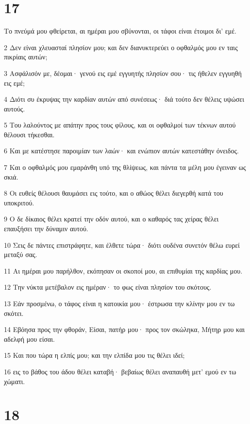 \chapter{17}

\par Το πνεύμά μου φθείρεται, αι ημέραι μου σβύνονται, οι τάφοι είναι έτοιμοι δι' εμέ.
\par 2 Δεν είναι χλευασταί πλησίον μου; και δεν διανυκτερεύει ο οφθαλμός μου εν ταις πικρίαις αυτών;
\par 3 Ασφάλισόν με, δέομαι· γενού εις εμέ εγγυητής πλησίον σου· τις ήθελεν εγγυηθή εις εμέ;
\par 4 Διότι συ έκρυψας την καρδίαν αυτών από συνέσεως· διά τούτο δεν θέλεις υψώσει αυτούς.
\par 5 Του λαλούντος με απάτην προς τους φίλους, και οι οφθαλμοί των τέκνων αυτού θέλουσι τήκεσθαι.
\par 6 Και με κατέστησε παροιμίαν των λαών· και ενώπιον αυτών κατεστάθην όνειδος.
\par 7 Και ο οφθαλμός μου εμαράνθη υπό της θλίψεως, και πάντα τα μέλη μου έγειναν ως σκιά.
\par 8 Οι ευθείς θέλουσι θαυμάσει εις τούτο, και ο αθώος θέλει διεγερθή κατά του υποκριτού.
\par 9 Ο δε δίκαιος θέλει κρατεί την οδόν αυτού, και ο καθαρός τας χείρας θέλει επαυξήσει την δύναμιν αυτού.
\par 10 Σεις δε πάντες επιστράφητε, και έλθετε τώρα· διότι ουδένα συνετόν θέλω ευρεί μεταξύ σας.
\par 11 Αι ημέραι μου παρήλθον, εκόπησαν οι σκοποί μου, αι επιθυμίαι της καρδίας μου.
\par 12 Την νύκτα μετέβαλον εις ημέραν· το φως είναι πλησίον του σκότους.
\par 13 Εάν προσμένω, ο τάφος είναι η κατοικία μου· έστρωσα την κλίνην μου εν τω σκότει.
\par 14 Εβόησα προς την φθοράν, Είσαι, πατήρ μου· προς τον σκώληκα, Μήτηρ μου και αδελφή μου είσαι.
\par 15 Και που τώρα η ελπίς μου; και την ελπίδα μου τις θέλει ιδεί;
\par 16 εις το βάθος του άδου θέλει καταβή· βεβαίως θέλει αναπαυθή μετ' εμού εν τω χώματι.

\chapter{18}


